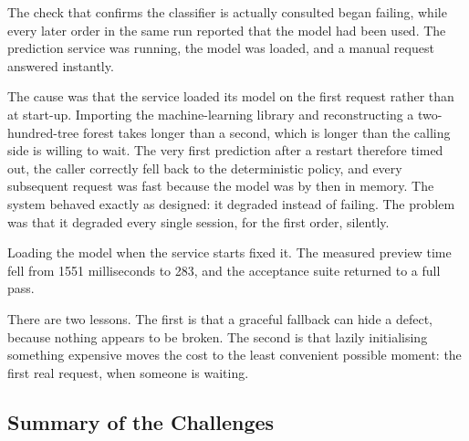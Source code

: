 \documentclass[12pt,a4paper]{report}
\begin{document}
The check that confirms the classifier is actually consulted began failing, while every later order
in the same run reported that the model had been used. The prediction service was running, the
model was loaded, and a manual request answered instantly.

The cause was that the service loaded its model on the first request rather than at start-up.
Importing the machine-learning library and reconstructing a two-hundred-tree forest takes longer
than a second, which is longer than the calling side is willing to wait. The very first prediction
after a restart therefore timed out, the caller correctly fell back to the deterministic policy, and
every subsequent request was fast because the model was by then in memory. The system behaved
exactly as designed: it degraded instead of failing. The problem was that it degraded every single
session, for the first order, silently.

Loading the model when the service starts fixed it. The measured preview time fell from 1551
milliseconds to 283, and the acceptance suite returned to a full pass.

There are two lessons. The first is that a graceful fallback can hide a defect, because nothing
appears to be broken. The second is that lazily initialising something expensive moves the cost to
the least convenient possible moment: the first real request, when someone is waiting.

\subsection{Summary of the Challenges}
\end{document}
